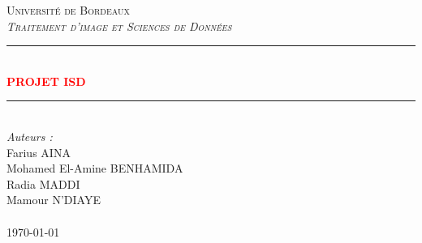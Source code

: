 \documentclass[a4paper, 12pt]{article} %
\newcommand{\HRule}{\rule{\linewidth}{0.5mm}} %
\begin{document}
 

\everymath{\displaystyle}


\begin{titlepage}

\begin{center} %


\textsc{\huge{}Université de Bordeaux} \\[2 cm]


\textsc{\large{} \textit{Traitement d'image et Sciences de Données }} \\[0.5cm] %

\HRule \\[0.6cm]
{\huge\bfseries{}\textcolor{Red}{PROJET ISD}} \\[0.25cm]
\HRule \\[1.5cm]

\Large\textit{Auteurs :} \\[0.5cm]

Farius \textsc{AINA}\\[0.5cm] %

Mohamed El-Amine \textsc{BENHAMIDA}\\[0.5cm] %

Radia \textsc{MADDI}\\[0.5cm] %

Mamour \textsc{N'DIAYE}\\[0.5cm] %

\Large\textbf{} \\[1.5cm]


{\large\today} \\[2cm]

\end{center}

\end{titlepage}



\tableofcontents
\setcounter{tocdepth}{3}
\newpage

\end{document}
